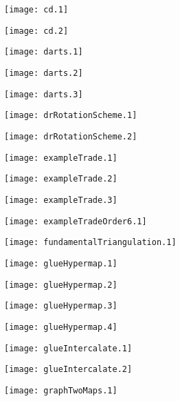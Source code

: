 \documentclass[12pt,a4paper,amstags,fleqn,reqno]{article}
\begin{document}
\begin{center} \texttt{[image: cd.1]} \end{center}
\begin{center} \texttt{[image: cd.2]} \end{center}
\begin{center} \texttt{[image: darts.1]} \end{center}
\begin{center} \texttt{[image: darts.2]} \end{center}
\begin{center} \texttt{[image: darts.3]} \end{center}
\begin{center} \texttt{[image: drRotationScheme.1]} \end{center}
\begin{center} \texttt{[image: drRotationScheme.2]} \end{center}
\begin{center} \texttt{[image: exampleTrade.1]} \end{center}
\begin{center} \texttt{[image: exampleTrade.2]} \end{center}
\begin{center} \texttt{[image: exampleTrade.3]} \end{center}
\begin{center} \texttt{[image: exampleTradeOrder6.1]} \end{center}
\begin{center} \texttt{[image: fundamentalTriangulation.1]} \end{center}
\begin{center} \texttt{[image: glueHypermap.1]} \end{center}
\begin{center} \texttt{[image: glueHypermap.2]} \end{center}
\begin{center} \texttt{[image: glueHypermap.3]} \end{center}
\begin{center} \texttt{[image: glueHypermap.4]} \end{center}
\begin{center} \texttt{[image: glueIntercalate.1]} \end{center}
\begin{center} \texttt{[image: glueIntercalate.2]} \end{center}
\begin{center} \texttt{[image: graphTwoMaps.1]} \end{center}
\end{document}
